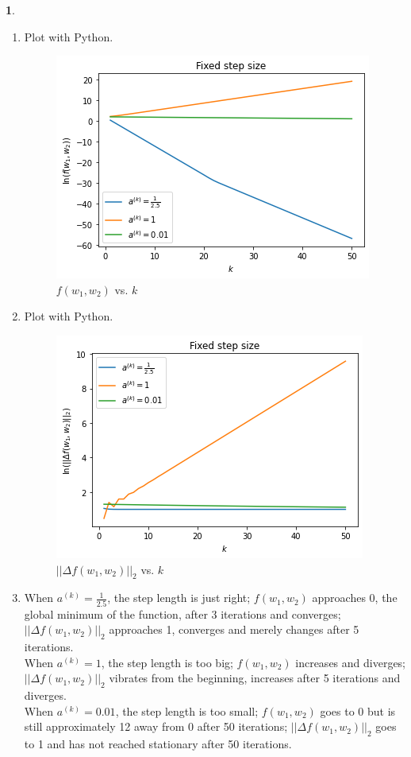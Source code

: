 \documentclass[10pt]{article}
\newtheorem{prob}{\bm{$Problem$}}
\begin{document}
\begin{prob}
\end{prob}
\begin{enumerate}[1)]
\vspace{3mm}

\item
Plot with Python.\\
\begin{figure}[H]
  \centering
  \includegraphics[scale=0.65]{p41a.png}
  \caption{$f(w_1,w_2)$ vs. $k$}
\end{figure}

\item
Plot with Python.\\
\begin{figure}[H]
  \centering
  \includegraphics[scale=0.65]{p42a.png}
  \caption{$||\Delta f(w_1,w_2)||_2$ vs. $k$}
\end{figure}

\item
When $a^{(k)}=\frac{1}{2.5}$, the step length is just right; $f(w_1,w_2)$ approaches 0, the global minimum of the function, after 3 iterations and converges; $||\Delta f(w_1,w_2)||_2$ approaches 1, converges and merely changes after 5 iterations.\\
When $a^{(k)}=1$, the step length is too big; $f(w_1,w_2)$ increases and diverges; $||\Delta f(w_1,w_2)||_2$ vibrates from the beginning, increases after 5 iterations and diverges.\\
When $a^{(k)}=0.01$, the step length is too small; $f(w_1,w_2)$ goes to 0 but is still approximately 12 away from 0 after 50 iterations; $||\Delta f(w_1,w_2)||_2$ goes to 1 and has not reached stationary after 50 iterations.\\


\end{enumerate}
\end{document}
